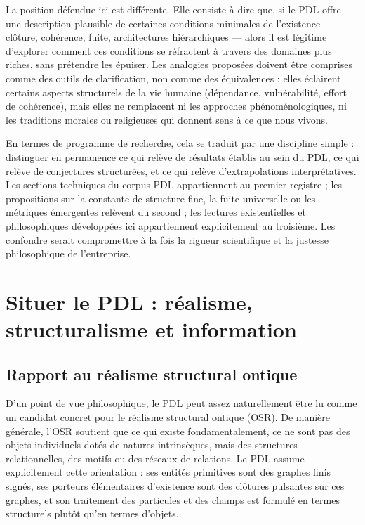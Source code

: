 \documentclass[11pt,a4paper]{article}
\theoremstyle{definition}
\begin{document}
La position défendue ici est différente. Elle consiste à dire que, si le PDL offre une description plausible de certaines conditions minimales de l’existence — clôture, cohérence, fuite, architectures hiérarchiques — alors il est légitime d’explorer comment ces conditions se réfractent à travers des domaines plus riches, sans prétendre les épuiser.\cite{Laubscher_Existence_PulsatingClosure_2026} Les analogies proposées doivent être comprises comme des outils de clarification, non comme des équivalences : elles éclairent certains aspects structurels de la vie humaine (dépendance, vulnérabilité, effort de cohérence), mais elles ne remplacent ni les approches phénoménologiques, ni les traditions morales ou religieuses qui donnent sens à ce que nous vivons.

En termes de programme de recherche, cela se traduit par une discipline simple : distinguer en permanence ce qui relève de résultats établis au sein du PDL, ce qui relève de conjectures structurées, et ce qui relève d’extrapolations interprétatives.\cite{Laubscher_PDL_Position_2024,Laubscher_PDL_GlobalMapping_v6_2024} Les sections techniques du corpus PDL appartiennent au premier registre ; les propositions sur la constante de structure fine, la fuite universelle ou les métriques émergentes relèvent du second ; les lectures existentielles et philosophiques développées ici appartiennent explicitement au troisième. Les confondre serait compromettre à la fois la rigueur scientifique et la justesse philosophique de l’entreprise.

\section{Situer le PDL : réalisme, structuralisme et information}
\label{sec:positioning}

\subsection{Rapport au réalisme structural ontique}

D’un point de vue philosophique, le PDL peut assez naturellement être lu comme un candidat concret pour le réalisme structural ontique (OSR). De manière générale, l’OSR soutient que ce qui existe fondamentalement, ce ne sont pas des objets individuels dotés de natures intrinsèques, mais des structures relationnelles, des motifs ou des réseaux de relations.\cite{Laubscher_Existence_PulsatingClosure_2026,Laubscher_PDL_Position_2024} Le PDL assume explicitement cette orientation : ses entités primitives sont des graphes finis signés, ses porteurs élémentaires d’existence sont des clôtures pulsantes sur ces graphes, et son traitement des particules et des champs est formulé en termes structurels plutôt qu’en termes d’objets.\cite{Laubscher_EmergencePhysicalReality_2024,Laubscher_MinimalClosures_46_2024}
\end{document}

